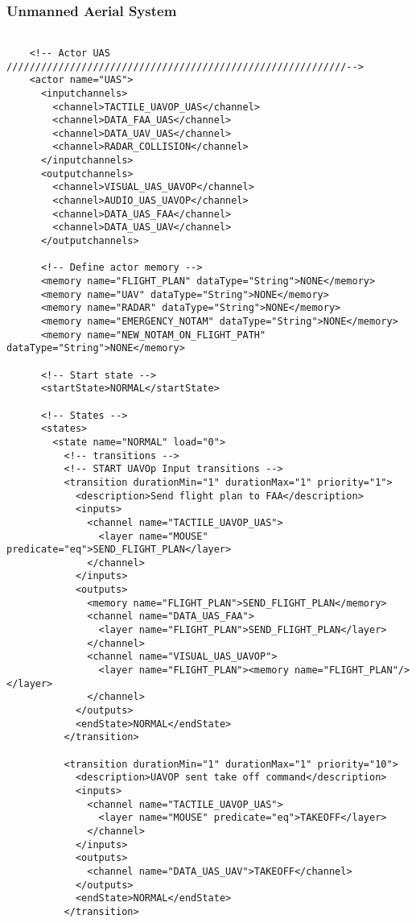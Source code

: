 \subsubsection{Unmanned Aerial System} 
\begin{verbatim}

    <!-- Actor UAS ///////////////////////////////////////////////////////////-->
    <actor name="UAS">
      <inputchannels>
        <channel>TACTILE_UAVOP_UAS</channel>
        <channel>DATA_FAA_UAS</channel>
        <channel>DATA_UAV_UAS</channel>
        <channel>RADAR_COLLISION</channel>
      </inputchannels>
      <outputchannels>
        <channel>VISUAL_UAS_UAVOP</channel>
        <channel>AUDIO_UAS_UAVOP</channel>
        <channel>DATA_UAS_FAA</channel>
        <channel>DATA_UAS_UAV</channel>
      </outputchannels>
      
      <!-- Define actor memory -->
      <memory name="FLIGHT_PLAN" dataType="String">NONE</memory>     
      <memory name="UAV" dataType="String">NONE</memory>
      <memory name="RADAR" dataType="String">NONE</memory>
      <memory name="EMERGENCY_NOTAM" dataType="String">NONE</memory>
      <memory name="NEW_NOTAM_ON_FLIGHT_PATH" dataType="String">NONE</memory>
      
      <!-- Start state -->
      <startState>NORMAL</startState>
      
      <!-- States -->
      <states>
        <state name="NORMAL" load="0">
          <!-- transitions -->
          <!-- START UAVOp Input transitions -->
          <transition durationMin="1" durationMax="1" priority="1">
            <description>Send flight plan to FAA</description>
            <inputs>
              <channel name="TACTILE_UAVOP_UAS">
                <layer name="MOUSE" predicate="eq">SEND_FLIGHT_PLAN</layer>
              </channel>
            </inputs>
            <outputs>
              <memory name="FLIGHT_PLAN">SEND_FLIGHT_PLAN</memory>
              <channel name="DATA_UAS_FAA">
                <layer name="FLIGHT_PLAN">SEND_FLIGHT_PLAN</layer>
              </channel>
              <channel name="VISUAL_UAS_UAVOP">
                <layer name="FLIGHT_PLAN"><memory name="FLIGHT_PLAN"/></layer>
              </channel>
            </outputs>
            <endState>NORMAL</endState>
          </transition>
 
          <transition durationMin="1" durationMax="1" priority="10">
            <description>UAVOP sent take off command</description>
            <inputs>
              <channel name="TACTILE_UAVOP_UAS">
                <layer name="MOUSE" predicate="eq">TAKEOFF</layer>
              </channel>
            </inputs>
            <outputs>
              <channel name="DATA_UAS_UAV">TAKEOFF</channel>
            </outputs>
            <endState>NORMAL</endState>
          </transition>
          

\end{verbatim}
